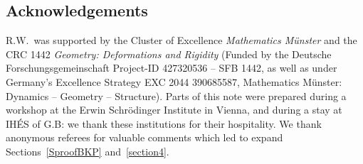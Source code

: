\documentclass[pdftex]{sigma}
\numberwithin{equation}{section}
\begin{document}
\subsection*{Acknowledgements}

R.W.\ was supported by the Cluster of Excellence
\emph{Mathematics M\"unster} and the CRC 1442 \emph{Geometry:
 Deformations and Rigidity} (Funded by the Deutsche
 Forschungsgemeinschaft
 Project-ID 427320536 -- SFB 1442, as well as under Germany's
 Excellence Strategy EXC 2044 390685587, Mathematics M\"unster:
 Dynamics -- Geometry -- Structure). Parts of this note were prepared during
a workshop at the Erwin Schr\"odinger Institute in Vienna, and during a stay at IH\'ES of G.B: we thank these institutions for their hospitality. We thank anonymous referees for valuable comments which led to expand Sections~\ref{SproofBKP} and~\ref{section4}.

\newpage
\end{document}
